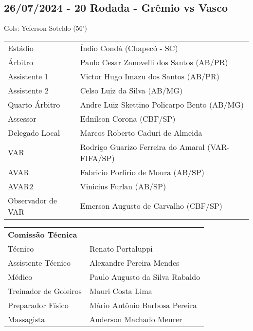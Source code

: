 \newpage
\subsection{26/07/2024 - 20 Rodada - Grêmio vs Vasco}

\begin{figure}[H]
    \centering
    
\end{figure}

Gols: Yeferson Soteldo (56')

\begin{table}[H]
\begin{tabular}{ll}
Estádio      & Índio Condá (Chapecó - SC) \\
Árbitro      & Paulo Cesar Zanovelli dos Santos (AB/PR) \\
Assistente 1 & Victor Hugo Imazu dos Santos (AB/PR) \\
Assistente 2 & Celso Luiz da Silva (AB/MG)          \\
Quarto Árbitro &  Andre Luiz Skettino Policarpo Bento (AB/MG)  \\
Assessor & Ednilson Corona (CBF/SP) \\
Delegado Local & Marcos Roberto Caduri de Almeida \\
VAR & Rodrigo Guarizo Ferreira do Amaral (VAR-FIFA/SP) \\
AVAR & Fabricio Porfirio de Moura (AB/SP) \\
AVAR2 & Vinicius Furlan (AB/SP) \\
Observador de VAR & Emerson Augusto de Carvalho (CBF/SP) \\
\end{tabular}
\end{table}

\begin{table}[H]
\begin{tabular}{ll}
\multicolumn{2}{l}{\textbf{Comissão Técnica}}          \\
Técnico               & Renato Portaluppi              \\
Assistente Técnico    & Alexandre Pereira Mendes       \\
Médico                & Paulo Augusto da Silva Rabaldo \\
Treinador de Goleiros & Mauri Costa Lima               \\
Preparador Físico     & Mário Antônio Barbosa Pereira  \\
Massagista            & Anderson Machado Meurer       
\end{tabular}
\end{table}


